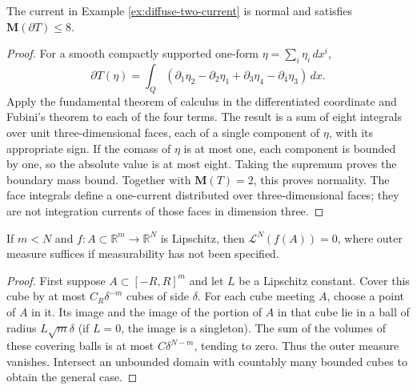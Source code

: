 \begin{proposition}\label{prop:diffuse-current-normal}
The current in Example \ref{ex:diffuse-two-current} is normal and satisfies $\mathbf M(\partial T)\leq8$.
\end{proposition}
\begin{proof}
For a smooth compactly supported one-form $\eta=\sum_i\eta_i\,dx^i$,
\[
 \partial T(\eta)=\int_Q(\partial_1\eta_2-\partial_2\eta_1
 +\partial_3\eta_4-\partial_4\eta_3)\,dx.
\]
Apply the fundamental theorem of calculus in the differentiated coordinate and Fubini's theorem to each of the four terms. The result is a sum of eight integrals over unit three-dimensional faces, each of a single component of $\eta$, with its appropriate sign. If the comass of $\eta$ is at most one, each component is bounded by one, so the absolute value is at most eight. Taking the supremum proves the boundary mass bound. Together with $\mathbf M(T)=2$, this proves normality. The face integrals define a one-current distributed over three-dimensional faces; they are not integration currents of those faces in dimension three.
\end{proof}

\begin{lemma}\label{lem:lipschitz-image-ambient-null}
If $m<N$ and $f:A\subset\mathbb R^m\to\mathbb R^N$ is Lipschitz, then $\mathcal L^N(f(A))=0$, where outer measure suffices if measurability has not been specified.
\end{lemma}
\begin{proof}
First suppose $A\subset[-R,R]^m$ and let $L$ be a Lipschitz constant. Cover this cube by at most $C_R\delta^{-m}$ cubes of side $\delta$. For each cube meeting $A$, choose a point of $A$ in it. Its image and the image of the portion of $A$ in that cube lie in a ball of radius $L\sqrt m\delta$ (if $L=0$, the image is a singleton). The sum of the volumes of these covering balls is at most $C\delta^{N-m}$, tending to zero. Thus the outer measure vanishes. Intersect an unbounded domain with countably many bounded cubes to obtain the general case.
\end{proof}

